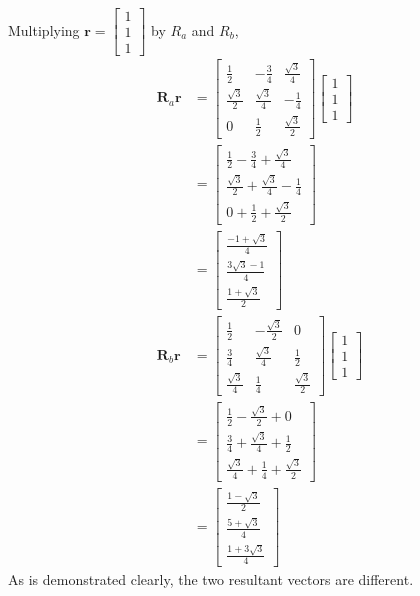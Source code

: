 \documentclass[]{article}
\begin{document}
Multiplying \(\mathbf{r} = \begin{bmatrix}
1 \\
1 \\
1
\end{bmatrix}\) by \(R_a\) and \(R_b\),
\begin{align}
	\mathbf{R}_a \mathbf{r} &= 
	\begin{bmatrix}
	\frac{1}{2} & -\frac{3}{4} & \frac{\sqrt{3}}{4} \\
	\frac{\sqrt{3}}{2} & \frac{\sqrt{3}}{4} & -\frac{1}{4} \\
	0 & \frac{1}{2} & \frac{\sqrt{3}}{2}
	\end{bmatrix}
	\begin{bmatrix}
	1 \\
	1 \\
	1
	\end{bmatrix} \\
	&= \begin{bmatrix}
	\frac{1}{2} - \frac{3}{4} + \frac{\sqrt{3}}{4} \\
	\frac{\sqrt{3}}{2} + \frac{\sqrt{3}}{4} - \frac{1}{4} \\
	0 + \frac{1}{2} + \frac{\sqrt{3}}{2}
	\end{bmatrix} \\
	&= \begin{bmatrix}
	\frac{-1 + \sqrt{3}}{4} \\
	\frac{3\sqrt{3} - 1}{4} \\
	\frac{1 + \sqrt{3}}{2}
	\end{bmatrix} \\
	\mathbf{R}_b \mathbf{r} &= 
	\begin{bmatrix}
	\frac{1}{2} & -\frac{\sqrt{3}}{2} & 0 \\
	\frac{3}{4} & \frac{\sqrt{3}}{4} & \frac{1}{2} \\
	\frac{\sqrt{3}}{4} & \frac{1}{4} & \frac{\sqrt{3}}{2} 
	\end{bmatrix}
	\begin{bmatrix}
	1 \\
	1 \\
	1
	\end{bmatrix} \\
	&= \begin{bmatrix}
	\frac{1}{2} - \frac{\sqrt{3}}{2} + 0 \\
	\frac{3}{4} + \frac{\sqrt{3}}{4} + \frac{1}{2} \\
	\frac{\sqrt{3}}{4} + \frac{1}{4} + \frac{\sqrt{3}}{2} 
	\end{bmatrix} \\
	&= \begin{bmatrix}
	\frac{1 - \sqrt{3}}{2} \\
	\frac{5 + \sqrt{3}}{4} \\
	\frac{1 + 3\sqrt{3}}{4}
	\end{bmatrix}
\end{align}
As is demonstrated clearly, the two resultant vectors are different. 
\end{document}
